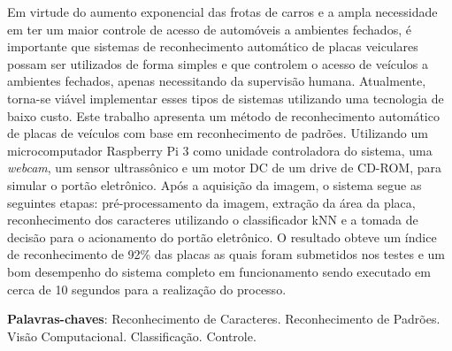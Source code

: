 
\setlength{\absparsep}{18pt} %
\begin{resumo}
 Em virtude do aumento exponencial das frotas de carros e a ampla necessidade em ter um maior controle de acesso de automóveis a ambientes fechados, é importante que sistemas de reconhecimento automático de placas veiculares possam ser utilizados de forma simples e que controlem o acesso de veículos a ambientes fechados, apenas necessitando da supervisão humana. Atualmente, torna-se viável implementar esses tipos de sistemas utilizando uma tecnologia de baixo custo. Este trabalho apresenta um método de reconhecimento automático de placas de veículos com base em reconhecimento de padrões. Utilizando um microcomputador Raspberry Pi 3 como unidade controladora do sistema, uma \textit{webcam}, um sensor ultrassônico e um motor DC de um drive de CD-ROM, para simular o portão eletrônico. Após a aquisição da imagem, o sistema segue as seguintes etapas: pré-processamento da imagem, extração da área da placa, reconhecimento dos caracteres utilizando o classificador kNN e a tomada de decisão para o acionamento do portão eletrônico. O resultado obteve um índice de reconhecimento de 92\% das placas as quais foram submetidos nos testes e um bom desempenho do sistema completo em funcionamento sendo executado em cerca de 10 segundos para a realização do processo.

 \textbf{Palavras-chaves}: Reconhecimento de Caracteres. Reconhecimento de Padrões. Visão Computacional. Classificação. Controle.
\end{resumo}

